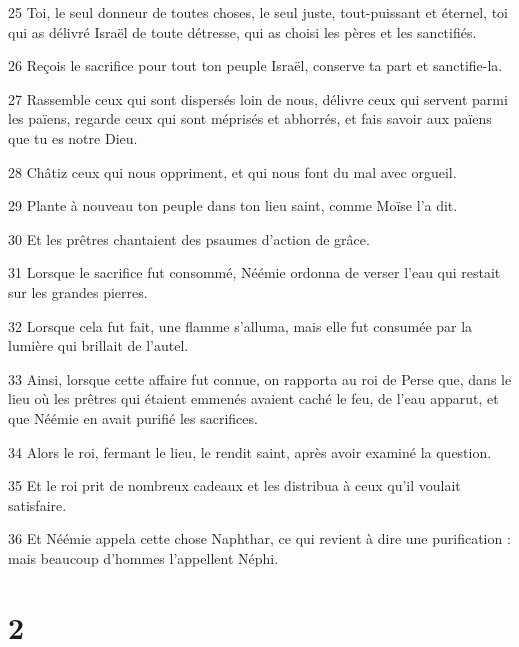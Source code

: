 \par 25 Toi, le seul donneur de toutes choses, le seul juste, tout-puissant et éternel, toi qui as délivré Israël de toute détresse, qui as choisi les pères et les sanctifiés.
\par 26 Reçois le sacrifice pour tout ton peuple Israël, conserve ta part et sanctifie-la.
\par 27 Rassemble ceux qui sont dispersés loin de nous, délivre ceux qui servent parmi les païens, regarde ceux qui sont méprisés et abhorrés, et fais savoir aux païens que tu es notre Dieu.
\par 28 Châtiz ceux qui nous oppriment, et qui nous font du mal avec orgueil.
\par 29 Plante à nouveau ton peuple dans ton lieu saint, comme Moïse l'a dit.
\par 30 Et les prêtres chantaient des psaumes d'action de grâce.
\par 31 Lorsque le sacrifice fut consommé, Néémie ordonna de verser l'eau qui restait sur les grandes pierres.
\par 32 Lorsque cela fut fait, une flamme s'alluma, mais elle fut consumée par la lumière qui brillait de l'autel.
\par 33 Ainsi, lorsque cette affaire fut connue, on rapporta au roi de Perse que, dans le lieu où les prêtres qui étaient emmenés avaient caché le feu, de l'eau apparut, et que Néémie en avait purifié les sacrifices.
\par 34 Alors le roi, fermant le lieu, le rendit saint, après avoir examiné la question.
\par 35 Et le roi prit de nombreux cadeaux et les distribua à ceux qu'il voulait satisfaire.
\par 36 Et Néémie appela cette chose Naphthar, ce qui revient à dire une purification : mais beaucoup d'hommes l'appellent Néphi.

\chapter{2}

